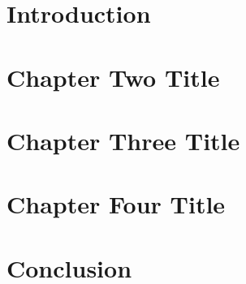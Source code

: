 \documentclass[11pt]{book}
\begin{document}
\mainmatter

\chapter{Introduction}



\chapter{Chapter Two Title}


 
\chapter{Chapter Three Title}


 
\chapter{Chapter Four Title}


 
\chapter{Conclusion}


\singlespacing


\end{document}
